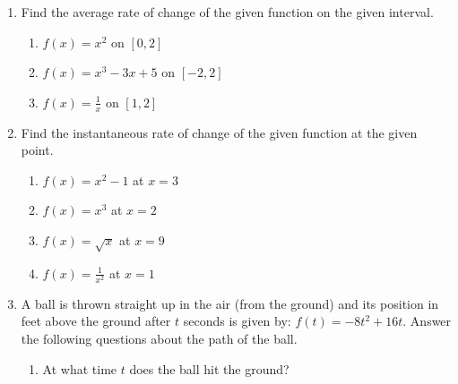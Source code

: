 \documentclass[12pt]{article}
\newif\ifans
\begin{document}
\begin{enumerate}

\item Find the average rate of change of the given function on the given interval.

\begin{enumerate}

\item $f(x) = x^2$ on $[0,2]$ 

\ifans{\fbox{2}} \fi

\item $f(x) = x^3-3x+5$ on $[-2,2]$ 

\ifans{\fbox{1}} \fi

\item $\displaystyle f(x) = \frac{1}{x}$ on $[1,2]$ 

\ifans{\fbox{$\displaystyle -\frac{1}{2}$}} \fi

\end{enumerate}

\item Find the instantaneous rate of change of the given function at the given point. 

\begin{enumerate}

\item $f(x) = x^2-1$ at $x=3$

\ifans{\fbox{6}} \fi

\item $f(x) = x^3$ at $x=2$ 

\ifans{\fbox{12}} \fi

\item $f(x)=\sqrt{x}$ at $x=9$

\ifans{\fbox{$\displaystyle \frac{1}{6}$}} \fi

\item $\displaystyle f(x) = \frac{1}{x^2}$ at $x=1$ 

\ifans{\fbox{$-2$}} \fi

\end{enumerate}

\item A ball is thrown straight up in the air (from the ground) and its position in feet above the ground after $t$ seconds is given by: $f(t) = -8t^2+16t$. Answer the following questions about the path of the ball. 

\begin{enumerate}

\item  At what time $t$ does the ball hit the ground? 


\end{enumerate}
\end{enumerate}
\end{document}
